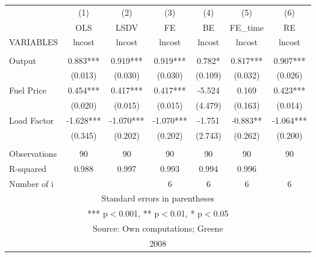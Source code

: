 \documentclass[]{article}
\begin{document}
\begin{tabular}{lcccccc} \hline
 & (1) & (2) & (3) & (4) & (5) & (6) \\
 & OLS & LSDV & FE & BE & FE\_time & RE \\
VARIABLES & lncost & lncost & lncost & lncost & lncost & lncost \\ \hline
 &  &  &  &  &  &  \\
Output & 0.883*** & 0.919*** & 0.919*** & 0.782* & 0.817*** & 0.907*** \\
 & (0.013) & (0.030) & (0.030) & (0.109) & (0.032) & (0.026) \\
Fuel Price & 0.454*** & 0.417*** & 0.417*** & -5.524 & 0.169 & 0.423*** \\
 & (0.020) & (0.015) & (0.015) & (4.479) & (0.163) & (0.014) \\
Load Factor & -1.628*** & -1.070*** & -1.070*** & -1.751 & -0.883** & -1.064*** \\
 & (0.345) & (0.202) & (0.202) & (2.743) & (0.262) & (0.200) \\
 &  &  &  &  &  &  \\
Observations & 90 & 90 & 90 & 90 & 90 & 90 \\
R-squared & 0.988 & 0.997 & 0.993 & 0.994 & 0.996 &  \\
 Number of i &  &  & 6 & 6 & 6 & 6 \\ \hline
\multicolumn{7}{c}{ Standard errors in parentheses} \\
\multicolumn{7}{c}{ *** p$<$0.001, ** p$<$0.01, * p$<$0.05} \\
\multicolumn{7}{c}{ Source: Own computations; Greene} \\
\multicolumn{7}{c}{ 2008} \\
\end{tabular}
\end{document}
